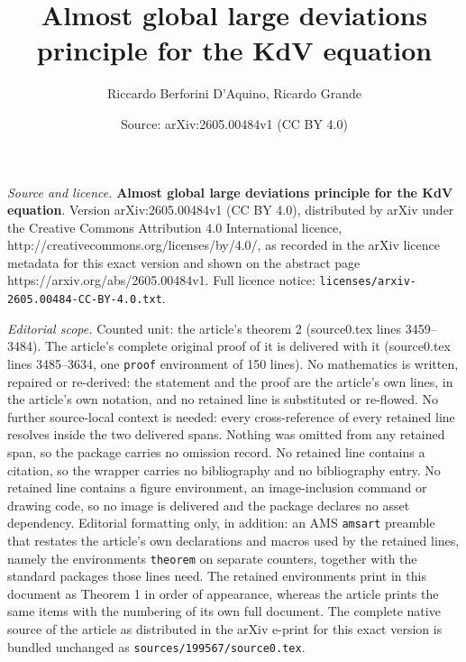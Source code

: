 \documentclass[10pt,a4paper]{amsart}
\title{{\bf Almost global large deviations principle for the KdV equation}}
\author{Riccardo Berforini D'Aquino, Ricardo Grande}
\date{Source: arXiv:2605.00484v1 (CC BY 4.0)}
\begin{document}
\maketitle

\noindent\emph{Source and licence.} {\bf Almost global large deviations principle for the KdV equation}. Version arXiv:2605.00484v1 (CC BY 4.0), distributed by arXiv under the Creative Commons Attribution 4.0 International licence, http://creativecommons.org/licenses/by/4.0/, as recorded in the arXiv licence metadata for this exact version and shown on the abstract page https://arxiv.org/abs/2605.00484v1. Full licence notice: \texttt{licenses/arxiv-2605.00484-CC-BY-4.0.txt}.\par\smallskip

\noindent\textit{Editorial scope.} Counted unit: the article's theorem 2 (source0.tex lines 3459--3484). The article's complete original proof of it is delivered with it (source0.tex lines 3485--3634, one \texttt{proof} environment of 150 lines). No mathematics is written, repaired or re-derived: the statement and the proof are the article's own lines, in the article's own notation, and no retained line is substituted or re-flowed.  No further source-local context is needed: every cross-reference of every retained line resolves inside the two delivered spans.  Nothing was omitted from any retained span, so the package carries no omission record.  No retained line contains a citation, so the wrapper carries no bibliography and no bibliography entry.  No retained line contains a figure environment, an image-inclusion command or drawing code, so no image is delivered and the package declares no asset dependency.  Editorial formatting only, in addition: an AMS \texttt{amsart} preamble that restates the article's own declarations and macros used by the retained lines, namely the environments \texttt{theorem} on separate counters, together with the standard packages those lines need.  The retained environments print in this document as Theorem 1 in order of appearance, whereas the article prints the same items with the numbering of its own full document.  The complete native source of the article as distributed in the arXiv e-print for this exact version is bundled unchanged as \texttt{sources/199567/source0.tex}.
\end{document}
